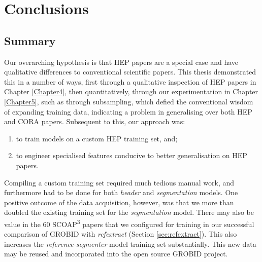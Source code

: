 
\chapter{Conclusions} %

\label{Chapter6} %



\section{Summary}

Our overarching hypothesis is that HEP papers are a special case and have qualitative differences to conventional scientific papers. This thesis demonstrated this in a number of ways, first through a qualitative inspection of HEP papers in Chapter \ref{Chapter4}, then quantitatively, through our experimentation in Chapter \ref{Chapter5}, such as through subsampling, which defied the conventional wisdom of expanding training data, indicating a problem in generalising over both HEP and CORA papers. Subsequent to this, our approach was:

\begin{enumerate}
\item to train models on a custom HEP training set, and;
\item to engineer specialised features conducive to better generalisation on HEP papers.
\end{enumerate}

Compiling a custom training set required much tedious manual work, and furthermore had to be done for both \emph{header} and \emph{segmentation} models.  One positive outcome of the data acquisition, however, was that we more than doubled the existing training set for the \emph{segmentation} model. There may also be value in the 60 SCOAP\textsuperscript{3} papers that we configured for training in our successful comparison of GROBID with \emph{refextract} (Section \ref{sec:refextract}). This also increases the \emph{reference-segmenter} model training set substantially. This new data may be reused and incorporated into the open source GROBID project.

